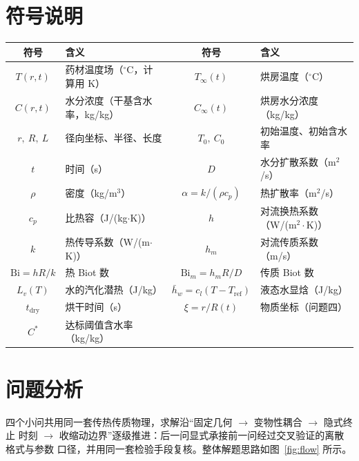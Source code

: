 \documentclass[withoutpreface,bwprint]{cumcmthesis} %
\begin{document}
\section{符号说明}
\begin{center}
\small
\setlength{\tabcolsep}{4pt}
\begin{tabular}{clcl}
    \toprule
    符号 & 含义 & 符号 & 含义 \\
    \midrule
    $T(r,t)$ & 药材温度场（$^\circ$C，计算用 K） & $T_\infty(t)$ & 烘房温度（$^\circ$C） \\
    $C(r,t)$ & 水分浓度（干基含水率，kg/kg） & $C_\infty(t)$ & 烘房水分浓度（kg/kg） \\
    $r,\ R,\ L$ & 径向坐标、半径、长度 & $T_0,\ C_0$ & 初始温度、初始含水率 \\
    $t$ & 时间（s） & $D$ & 水分扩散系数（m$^2$/s） \\
    $\rho$ & 密度（kg/m$^3$） & $\alpha=k/(\rho c_p)$ & 热扩散率（m$^2$/s） \\
    $c_p$ & 比热容（J/(kg$\cdot$K)） & $h$ & 对流换热系数（W/(m$^2\cdot$K)） \\
    $k$ & 热传导系数（W/(m$\cdot$K)） & $h_m$ & 对流传质系数（m/s） \\
    $\mathrm{Bi}=hR/k$ & 热 Biot 数 & $\mathrm{Bi}_m=h_mR/D$ & 传质 Biot 数 \\
    $L_v(T)$ & 水的汽化潜热（J/kg） & $\bar h_w=c_l(T-T_{\mathrm{ref}})$ & 液态水显焓（J/kg） \\
    $t_{\mathrm{dry}}$ & 烘干时间（s） & $\xi=r/R(t)$ & 物质坐标（问题四） \\
    $C^{*}$ & 达标阈值含水率（kg/kg） & & \\
    \bottomrule
\end{tabular}
\end{center}

\section{问题分析}

四个小问共用同一套传热传质物理，求解沿``固定几何 $\to$ 变物性耦合 $\to$ 隐式终止
时刻 $\to$ 收缩动边界''逐级推进：后一问显式承接前一问经过交叉验证的离散格式与参数
口径，并用同一套检验手段复核。整体解题思路如图~\ref{fig:flow} 所示。
\end{document}
